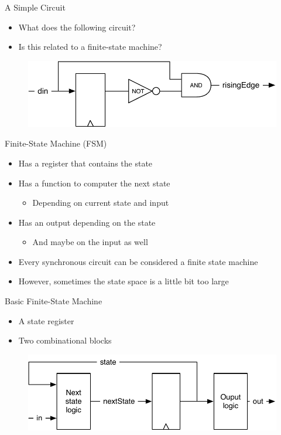 \begin{frame}[fragile]{A Simple Circuit}
\begin{itemize}
\item What does the following circuit?
\item Is this related to a finite-state machine?
\end{itemize}
\begin{figure}
  \includegraphics[scale=\scale]{../figures/fsm-rising}
\end{figure}
\end{frame}

\begin{frame}[fragile]{Finite-State Machine (FSM)}
\begin{itemize}
\item Has a register that contains the state
\item Has a function to computer the next state
\begin{itemize}
\item Depending on current state and input
\end{itemize}
\item Has an output depending on the state
\begin{itemize}
\item And maybe on the input as well
\end{itemize}
\item Every synchronous circuit can be considered a finite state machine
\item However, sometimes the state space is a little bit too large
\end{itemize}
\end{frame}

\begin{frame}[fragile]{Basic Finite-State Machine}
\begin{itemize}
\item A state register
\item Two combinational blocks
\end{itemize}
\begin{figure}
  \includegraphics[scale=\scale]{../figures/fsm}
\end{figure}
\end{frame}

